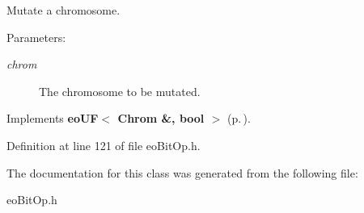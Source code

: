 Mutate a chromosome. 

\begin{Desc}
\item[Parameters:]
\begin{description}
\item[{\em chrom}]The chromosome to be mutated. \end{description}
\end{Desc}


Implements {\bf eo\-UF$<$ Chrom \&, bool $>$} {\rm (p.\,\pageref{classeo_u_f_a1})}.

Definition at line 121 of file eo\-Bit\-Op.h.

The documentation for this class was generated from the following file:\begin{CompactItemize}
\item 
eo\-Bit\-Op.h\end{CompactItemize}
